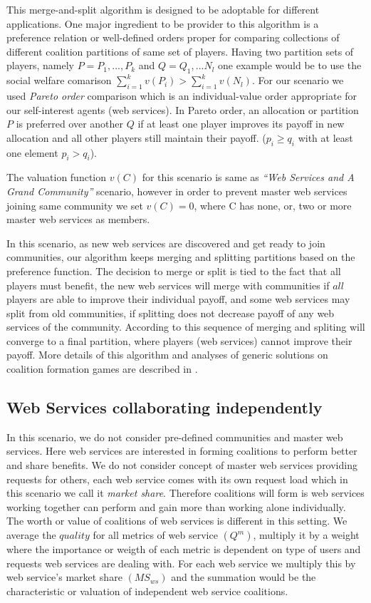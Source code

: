 \documentclass[10pt, conference, compsocconf]{IEEEtran}
\theoremstyle{plain}
\theoremstyle{definition}
\begin{document}
This merge-and-split algorithm is designed to be adoptable for different applications. One major ingredient to be provider to this algorithm is a preference relation or well-defined orders proper for comparing collections of different coalition partitions of same set of players. Having two partition sets of players, namely $P = {P_1,...,P_k}$ and $Q = {Q_1,...N_l}$ one example would be to use the social welfare comarison $\sum^k_{i=1}v(P_i) > \sum^k_{i=1}v(N_l)$. For our scenario we used \emph{Pareto order} comparison which is an individual-value order appropriate for our self-interest agents (web services). In Pareto order, an allocation or partition $P$ is preferred over another $Q$ if at least one player improves its payoff in new allocation and all other players still maintain their payoff. ($p_i \geq q_i$ with at least one element $p_i > q_i$).

The valuation function $v(C)$ for this scenario is same as \emph{``Web Services and A Grand Community''} scenario, however in order to prevent master web services joining same community we set $v(C) = 0$, where C has none, or, two or more master web services as members. 

In this scenario, as new web services are discovered and get ready to join communities, our algorithm keeps merging and splitting partitions based on the preference function. The decision to merge or split is tied to the fact that all players must benefit, the new web services will merge with communities if $all$ players are able to improve their individual payoff, and some web services may split from old communities, if splitting does not decrease payoff of any web services of the community. According to \cite{DBLP:journals/corr/abs-cs-0605132} this sequence of merging and spliting will converge to a final partition, where players (web services) cannot improve their payoff. More details of this algorithm and analyses of generic solutions on coalition formation games are described in \cite{DBLP:journals/igtr/AptW09}.

\subsection {Web Services collaborating independently}

In this scenario, we do not consider pre-defined communities and master web services. Here web services are interested in forming coalitions to perform better and share benefits. We do not consider concept of master web services providing requests for others, each web service comes with its own request load which in this scenario we call it \emph{market share}. Therefore coalitions will form is web services working together can perform and gain more than working alone individually. The worth or value of coalitions of web services is different in this setting. We average the $quality$ for all metrics of web service $(Q^{m})$, multiply it by a weight where the importance or weigth of each metric is dependent on type of users and requests web services are dealing with. For each web service we multiply this by web service's market share $(MS_{ws})$ and the summation would be the characteristic or valuation of independent web service coalitions.
\end{document}
